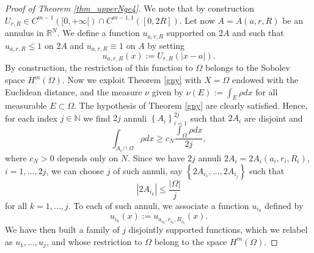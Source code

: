 \documentclass[11pt,a4paper]{amsart}
\numberwithin{equation}{section}
\begin{document}
\begin{proof}[Proof of Theorem \ref{thm_upperNge4}]
We note that by construction $U_{r,R}\in C^{m-1}([0,+\infty[)\cap C^{m-1,1}([0,2R])$. Let now $A=A(a,r,R)$ be an annulus in $\mathbb R^N$. We define a function $u_{a,r,R}$ supported on $2A$ and such that $u_{a,r,R}\leq 1$ on $2A$ and $u_{a,r,R}\equiv 1$ on $A$ by setting
\begin{equation}\label{radialu2}
u_{a,r,R}(x):=U_{r,R}(|x-a|).
\end{equation}
By construction, the restriction of this function to $\Omega$  belongs to the Sobolev space $H^m(\Omega)$. Now we exploit Theorem \ref{gny} with $X=\Omega$ endowed with the Euclidean distance, and the measure $\nu$ given by $\nu(E):=\int_{E} \rho dx$ for all measurable $E\subset\Omega$. The hypothesis of Theorem \ref{gny} are clearly satisfied. Hence, for each index $j\in\mathbb N$ we find $2j$ annuli $\left\{A_i\right\}_{i=1}^{2j}$ such that $2A_i$ are disjoint and  
\begin{equation*}
\int_{A_i\cap\Omega}\rho dx\geq c_N\frac{\int_{\Omega}\rho dx}{2j},
\end{equation*}
where $c_N>0$ depends only on $N$. Since we have $2j$ annuli $2A_i=2A_i(a_i,r_i,R_i)$, $i=1,...,2j$, we can choose $j$ of such annuli, say $\left\{2A_{i_1},...,2A_{i_j}\right\}$ such that 
\begin{equation}\label{choice}
|2A_{i_k}|\leq\frac{|\Omega|}{j}
\end{equation}
for all $k=1,...,j$. To each of such annuli, we associate a function $u_{i_k}$ defined by
\begin{equation}\label{radialu3}
u_{i_k}(x):=u_{a_{i_k},r_{i_k},R_{i_k}}(x).
\end{equation}
We have then built a family of $j$ disjointly supported functions, which we relabel as $u_1,...,u_j$, and whose restriction to $\Omega$ belong to the space $H^m(\Omega)$.


\end{proof}
\end{document}
